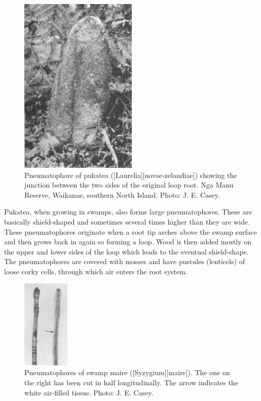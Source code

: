\begin{figure}
	\includegraphics[width=0.5\textwidth]{graphics/figure11pukatea.jpg}
	\centering
	\caption[Pneumatophore of pukatea showing the junction between the two sides of the original loop root]{Pneumatophore of pukatea ([Laurelia][novae-zelandiae]) showing the junction between the two sides of the original loop root.
	Nga Manu Reserve, Waikanae, southern North Island.
	Photo:  J. E. Casey.}%
	\label{fig:11pukatea}
\end{figure}

Pukatea, when growing in swamps, also forms large pneumatophores.
These are basically shield-shaped and sometimes several times higher than they are wide.
These pneumatophores originate when a root tip arches above the swamp surface and then grows back in again so forming a loop.
Wood is then added mostly on the upper and lower sides of the loop which leads to the eventual shield-shape.
The pneumatophores are covered with mosses and have pustules (lenticels) of loose corky cells, through which air enters the root system.

\begin{figure}
	\includegraphics[width=0.2\textwidth]{graphics/figure12swampmaire.jpg}
	\centering
	\caption[Pneumatophores of swamp maire]{Pneumatophores of swamp maire ([Syzygium][maire]).
	The one on the right has been cut in half longitudinally.
	The arrow indicates the white air-filled tissue.
	Photo:  J. E. Casey.}%
	\label{fig:12swampmaire}
\end{figure}

